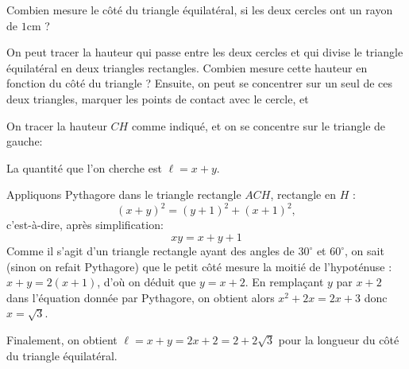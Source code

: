 
\begin{exo}
Combien mesure le côté du triangle équilatéral, si les deux cercles ont un rayon de $1$cm ?
\begin{center}
\end{center}
\begin{hint}
On peut tracer la hauteur qui passe entre les deux cercles et qui divise le triangle équilatéral en deux triangles rectangles. Combien mesure cette hauteur en fonction du côté du triangle ?
Ensuite, on peut se concentrer sur un seul de ces deux triangles, marquer les points de contact avec le cercle, et 
\end{hint}
\begin{sol}
On tracer la hauteur $CH$ comme indiqué, et on se concentre sur le triangle de gauche:
\begin{center}
\end{center}
La quantité que l'on cherche est $\ell = x+y$.



Appliquons Pythagore dans le triangle rectangle $ACH$, rectangle en $H$ : 
\[ (x+y)^2 = (y+1)^2+(x+1)^2,\]
c'est-à-dire, après simplification:
\[ xy = x+y+1\]
Comme il s'agit d'un triangle rectangle ayant des angles de $30^\circ$ et $60^\circ$, on sait (sinon on refait Pythagore) que le petit côté mesure la moitié de l'hypoténuse :
$x+y = 2(x+1)$, d'où on déduit que $y=x+2$.
En remplaçant $y$ par $x+2$ dans l'équation donnée par Pythagore, on obtient alors $x^2+2x = 2x+3$ donc $x=\sqrt{3}$.

Finalement, on obtient $\ell = x+y = 2x+2 = 2+2\sqrt 3$ pour la longueur du côté du triangle équilatéral.

\end{sol}
\end{exo}









